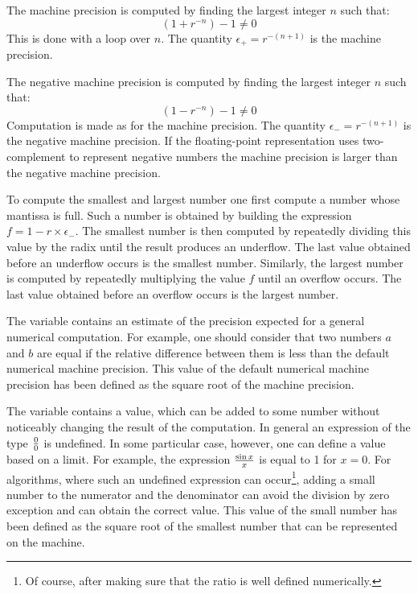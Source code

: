 The machine precision is computed by finding the largest integer
$n$ such that:
\begin{equation}
\left(1+r^{-n}\right)-1\ne 0
\end{equation}
This is done with a loop over $n$. The quantity
$\epsilon_+=r^{-\left(n+1\right)}$ is the machine precision.

The negative machine precision is computed by finding the largest
integer $n$ such that:
\begin{equation}
\left(1-r^{-n}\right)-1\ne 0
\end{equation}
Computation is made as for the machine precision. The quantity
$\epsilon_-=r^{-\left(n+1\right)}$ is the negative machine
precision. If the floating-point representation uses
two-complement to represent negative numbers the machine precision
is larger than the negative machine precision.

To compute the smallest and largest number one first compute a
number whose mantissa is full. Such a number is obtained by
building the expression $f=1-r \times \epsilon_-$. The smallest
number is then computed by repeatedly dividing this value by the
radix until the result produces an underflow. The last value
obtained before an underflow occurs is the smallest number.
Similarly, the largest number is computed by repeatedly
multiplying the value $f$ until an overflow occurs. The last value
obtained before an overflow occurs is the largest number.

The variable  contains an estimate
of the precision expected for a general numerical computation. For
example, one should consider that two numbers $a$ and $b$ are
equal if the relative difference between them is less than the
default numerical machine precision. This value of the default
numerical machine precision has been defined as the square root of
the machine precision.

The variable  contains a value, which can be
added to some number without noticeably changing the result of the
computation. In general an expression of the type $0 \over 0$ is
undefined. In some particular case, however, one can define a
value based on a limit. For example, the expression $\sin x \over
x $ is equal to 1 for $x=0$. For algorithms, where such an
undefined expression can occur\footnote{Of course, after making
sure that the ratio is well defined numerically.}, adding a small
number to the numerator and the denominator can avoid the division
by zero exception and can obtain the correct value. This value of
the small number has been defined as the square root of the
smallest number that can be represented on the machine.

